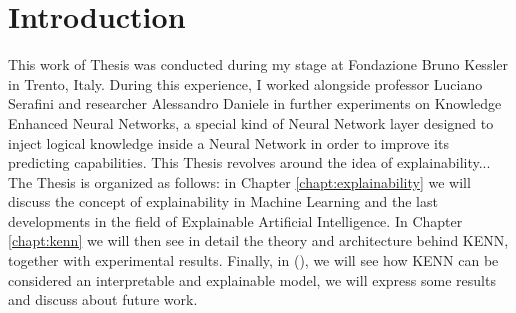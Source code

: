 \chapter{Introduction}
\label{introduction}
This work of Thesis was conducted during my stage at Fondazione Bruno Kessler in Trento, Italy. During this experience, I worked alongside professor Luciano Serafini and researcher Alessandro Daniele in further experiments on Knowledge Enhanced Neural Networks, a special kind of Neural Network layer designed to inject logical knowledge inside a Neural Network in order to improve its predicting capabilities. This Thesis revolves around the idea of explainability... The Thesis is organized as follows: in Chapter \ref{chapt:explainability} we will discuss the concept of explainability in Machine Learning and the last developments in the field of Explainable Artificial Intelligence. In Chapter \ref{chapt:kenn} we will then see in detail the theory and architecture behind KENN, together with experimental results. Finally, in (), we will see how KENN can be considered an interpretable and explainable model, we will express some results and discuss about future work.


